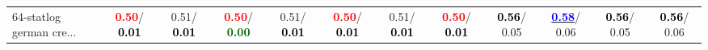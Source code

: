 \begin{table}[h]
\begin{center}
{\begin{tabular}{lc|c|c|c|c|c|c|c|c|c|c}
64-statlog german cre... & \textcolor{red}{\textbf{  0.50}}/\textcolor{black}{\textbf{  0.01}} &   0.51/\textcolor{black}{\textbf{  0.01}} & \textcolor{red}{\textbf{  0.50}}/\textcolor{darkgreen}{\textbf{  0.00}} &   0.51/\textcolor{black}{\textbf{  0.01}} & \textcolor{red}{\textbf{  0.50}}/\textcolor{black}{\textbf{  0.01}} &   0.51/\textcolor{black}{\textbf{  0.01}} & \textcolor{red}{\textbf{  0.50}}/\textcolor{black}{\textbf{  0.01}} & \textcolor{black}{\textbf{  0.56}}/  0.05 & \underline{\textcolor{blue}{\textbf{  0.58}}}/  0.06 & \textcolor{black}{\textbf{  0.56}}/  0.05 & \textcolor{black}{\textbf{  0.56}}/  0.06 \\\end{tabular}}\label{stratsBalAcc1bSVM}
\end{center}
\end{table}
